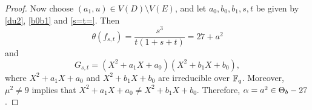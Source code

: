 \documentclass[10pt,a4paper]{amsart}
\newcommand{\f}{\Bbb F}
\begin{document}
\begin{proof}
Now choose $(a_1,u)\in V(D)\setminus V(E)$, and let $a_0,b_0,b_1,s,t$ be given by \eqref{du2}, \eqref{b0b1} and \eqref{s=t=}. Then
\[
\theta(f_{s,t})=\frac{s^3}{t(1+s+t)}=27+a^2
\]
and 
\[
G_{s,t}=(X^2+a_1X+a_0)(X^2+b_1X+b_0),
\]
where $X^2+a_1X+a_0$ and $X^2+b_1X+b_0$ are irreducible over $\f_q$. Moreover, $\mu^2\ne 9$ implies that $X^2+a_1X+a_0\ne X^2+b_1X+b_0$. Therefore, $\alpha=a^2\in\Theta_{\rm b}-27$.  
\end{proof}
\end{document}

